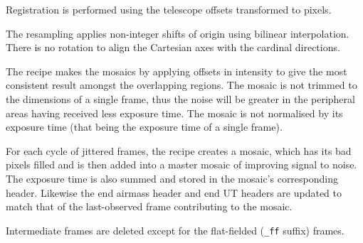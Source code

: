 \documentclass[twoside,11pt,nolof]{starlink}
\begin{document}
{{{         \sstitem
         Registration is performed using the telescope offsets
         transformed to pixels.

         \sstitem
         The resampling applies non-integer shifts of origin using
         bilinear interpolation.  There is no rotation to align the
         Cartesian axes with the cardinal directions.

         \sstitem
         The recipe makes the mosaics by applying offsets in intensity
         to give the most consistent result amongst the overlapping regions.
         The mosaic is not trimmed to the dimensions of a single frame, thus
         the noise will be greater in the peripheral areas having received
         less exposure time.  The mosaic is not normalised by its exposure
         time (that being the exposure time of a single frame).

         \sstitem
         For each cycle of jittered frames, the recipe creates a mosaic,
         which has its bad pixels filled and is then added into a master
         mosaic of improving signal to noise.  The exposure time is also
         summed and stored in the mosaic's corresponding header.
	 Likewise the end airmass header and end UT headers are
	 updated to match that of the last-observed frame contributing
	 to the mosaic.

         \sstitem
         Intermediate frames are deleted except for the flat-fielded ({\tt\_ff}
         suffix) frames.
      }
   }
   }
\end{document}

